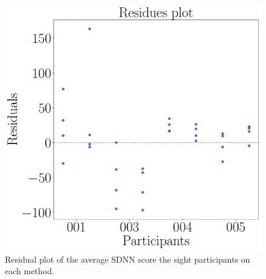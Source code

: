 \begin{figure}[!htb]
\begin{minipage}{0.45\textwidth}
        \centering
        \includegraphics[width = \textwidth]{Resultados/ECG/Figuras/pdf/residplot_sdnn_two_way_sight.pdf}
        \caption{Residual plot of the average SDNN score the sight participants on each method.}
        \label{fig:residplot_sdnn_two_way_sight}
    \end{minipage}
\end{figure}


%
%

%

\FloatBarrier